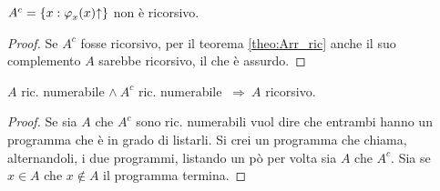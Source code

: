 \begin{theorem}
    $A^c=\{x:\semRAM_x(x)\textup{\ntermina}\}$ non è ricorsivo.
\end{theorem}
\begin{proof}
    Se $A^c$ fosse ricorsivo, per il teorema \ref{theo:Arr_ric} anche il suo complemento $A$ 
    sarebbe ricorsivo, il che è assurdo.
\end{proof}

\begin{theorem}
    $A$ ric. numerabile $\wedge\ A^c$ ric. numerabile $\ \Rightarrow\ A$ ricorsivo. 
\end{theorem}
\begin{proof}
    Se sia $A$ che $A^c$ sono ric. numerabili vuol dire che entrambi hanno un programma che
    è in grado di listarli. Si crei un programma che chiama, alternandoli, i due programmi,
    listando un pò per volta sia $A$ che $A^c$. Sia se $x\in A$ che $x\notin A$ il programma
    termina. 
\end{proof}

